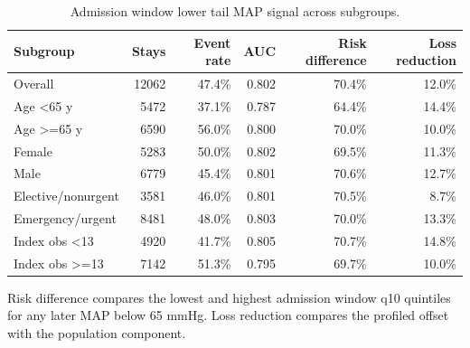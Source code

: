 \begin{table}[!htbp]
\caption{Admission window lower tail MAP signal across subgroups.}
\label{tab:subgroup_signal}
\centering
\begin{tabular}{lrrrrr}
\hline
Subgroup & Stays & Event rate & AUC & Risk difference & Loss reduction\\
\hline
Overall & 12062 & 47.4\% & 0.802 & 70.4\% & 12.0\%\\
Age <65 y & 5472 & 37.1\% & 0.787 & 64.4\% & 14.4\%\\
Age >=65 y & 6590 & 56.0\% & 0.800 & 70.0\% & 10.0\%\\
Female & 5283 & 50.0\% & 0.802 & 69.5\% & 11.3\%\\
Male & 6779 & 45.4\% & 0.801 & 70.6\% & 12.7\%\\
Elective/nonurgent & 3581 & 46.0\% & 0.801 & 70.5\% & 8.7\%\\
Emergency/urgent & 8481 & 48.0\% & 0.803 & 70.0\% & 13.3\%\\
Index obs <13 & 4920 & 41.7\% & 0.805 & 70.7\% & 14.8\%\\
Index obs >=13 & 7142 & 51.3\% & 0.795 & 69.7\% & 10.0\%\\
\hline
\end{tabular}
\par\smallskip
\footnotesize{Risk difference compares the lowest and highest admission window q10 quintiles for any later MAP below 65 mmHg. Loss reduction compares the profiled offset with the population component.}
\end{table}
